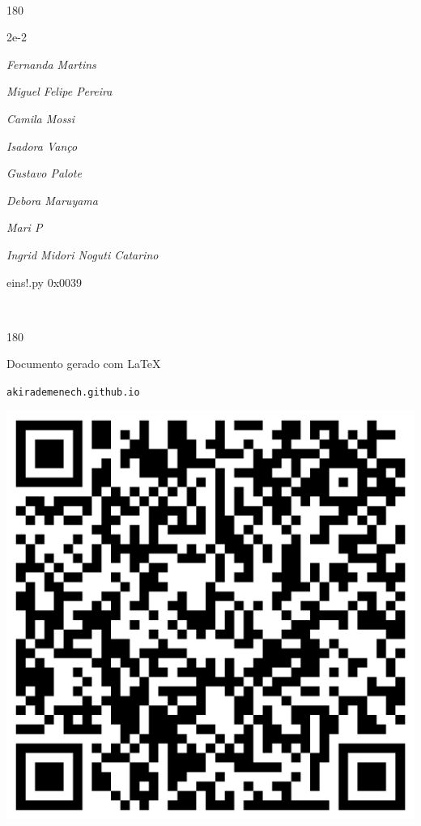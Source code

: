 \documentclass[12pt]{article}
\begin{document}
	\ 
	\vfill
	\begin{turn}{180}	
		\begin{minipage}{\textwidth}
		  	\ttfamily %
			\centering
			{\Huge 2e-2}
		  
			\hfill
		  
			

\textit{\small Fernanda Martins}

\textit{\small Miguel Felipe Pereira}

\textit{\small Camila Mossi}

\textit{\small Isadora Vanço}

\textit{\small Gustavo Palote}

\textit{\small Debora Maruyama}

\textit{\small Mari P}

\textit{\small Ingrid Midori Noguti Catarino}

\bigskip

eins!.py
0x0039


		\end{minipage}	
	\end{turn}
	\vfill
	\

\pagebreak

	\begin{turn}{180}	
		\begin{minipage}{\textwidth}		  
		  Documento gerado com \LaTeX			
		  
		  \texttt{akirademenech.github.io}

		  \includegraphics[height=0.3\textheight]{2e-2.pdf}

		\end{minipage}	
	\end{turn}  
		  
\end{document}
